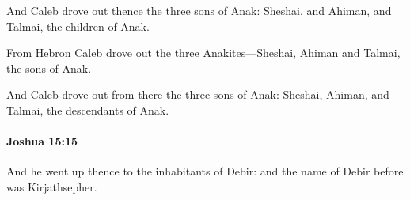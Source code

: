 			\begin{versebox}
					\item[BHS] 
					\item[ASV] And Caleb drove out thence the three sons of Anak: Sheshai, and Ahiman, and Talmai, the children of Anak.
					\item[NIV] From Hebron Caleb drove out the three Anakites—Sheshai, Ahiman and Talmai, the sons of Anak.
					\item[NRSV] And Caleb drove out from there the three sons of Anak: Sheshai, Ahiman, and Talmai, the descendants of Anak.
			\end{versebox}

		\paragraph{Joshua 15:15} %
			\label{JOSHUA-15-15}

			And he went up thence to the inhabitants of Debir: and the name of Debir before was Kirjathsepher.


